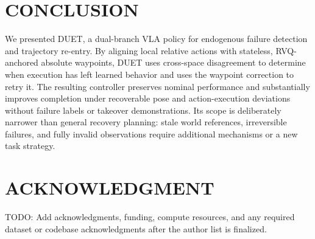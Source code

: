 \documentclass[letterpaper, 10 pt, conference]{ieeeconf}
\begin{document}
\section{CONCLUSION}

We presented DUET, a dual-branch VLA policy for endogenous failure detection and trajectory re-entry. By aligning local relative actions with stateless, RVQ-anchored absolute waypoints, DUET uses cross-space disagreement to determine when execution has left learned behavior and uses the waypoint correction to retry it. The resulting controller preserves nominal performance and substantially improves completion under recoverable pose and action-execution deviations without failure labels or takeover demonstrations. Its scope is deliberately narrower than general recovery planning: stale world references, irreversible failures, and fully invalid observations require additional mechanisms or a new task strategy.

\section*{ACKNOWLEDGMENT}

TODO: Add acknowledgments, funding, compute resources, and any required dataset or codebase acknowledgments after the author list is finalized.



\end{document}
